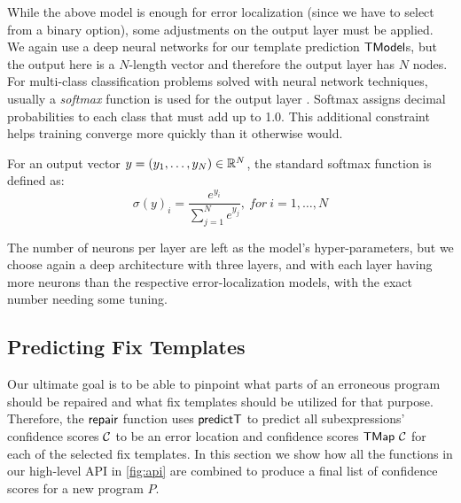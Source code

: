 While the above model is enough for error localization (since we have to select
from a binary option), some adjustments on the output layer must be applied. We
again use a deep neural networks for our template prediction $\mathsf{TModel}$s, but the
output here is a $N$-length vector and therefore the output layer has $N$ nodes.
For multi-class classification problems solved with neural network techniques,
usually a \emph{softmax} function is used for the output layer
\citep{Goodfellow-et-al-2016, Bishop-book-2006}. Softmax assigns decimal
probabilities to each class that must add up to 1.0. This additional constraint
helps training converge more quickly than it otherwise would.

For an output vector $y = (y_1, \dots, y_N) \in \mathbb{R}^{N}$, the standard softmax
function is defined as:
\[ \sigma(y)_i = \frac{e^{y_i}}{\sum_{j=1}^{N} e^{y_j}},\ for\ i = 1, \dots, N \]

The number of neurons per layer are left as the model's hyper-parameters, but we
choose again a deep architecture with three layers, and with each layer having
more neurons than the respective error-localization models, with the exact
number needing some tuning.



\subsection{Predicting Fix Templates}
\label{subsec:predict}

Our ultimate goal is to be able to pinpoint what parts of an erroneous program
should be repaired and what fix templates should be utilized for that purpose.
Therefore, the $\mathsf{repair}$ function uses $\mathsf{predictT}$ to predict all
subexpressions' confidence scores $\mathcal{C}$ to be an error location and
confidence scores $\mathsf{TMap}\ \mathcal{C}$ for each of the selected fix templates. In
this section we show how all the functions in our high-level API in
\autoref{fig:api} are combined to produce a final list of confidence scores for
a new program $P$.

